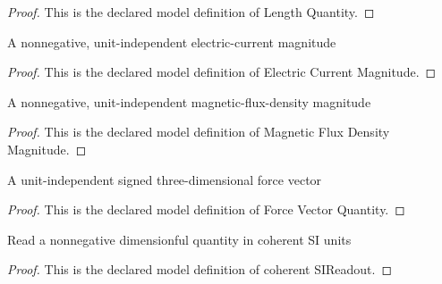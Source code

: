 \begin{proof}
  This is the declared model definition of Length Quantity.
\end{proof}
\begin{definition}
  \label{def:physics:phyx-mini-0952:phyxminiproblems-problemphyxmini0952-electriccurrentmagnitude}
  A nonnegative, unit-independent electric-current magnitude
\end{definition}
\begin{proof}
  This is the declared model definition of Electric Current Magnitude.
\end{proof}
\begin{definition}
  \label{def:physics:phyx-mini-0952:phyxminiproblems-problemphyxmini0952-magneticfluxdensitymagnitude}
  A nonnegative, unit-independent magnetic-flux-density magnitude
\end{definition}
\begin{proof}
  This is the declared model definition of Magnetic Flux Density Magnitude.
\end{proof}
\begin{definition}
  \label{def:physics:phyx-mini-0952:phyxminiproblems-problemphyxmini0952-forcevectorquantity}
  A unit-independent signed three-dimensional force vector
\end{definition}
\begin{proof}
  This is the declared model definition of Force Vector Quantity.
\end{proof}
\begin{definition}
  \label{def:physics:phyx-mini-0952:phyxminiproblems-problemphyxmini0952-coherentsireadout}
  Read a nonnegative dimensionful quantity in coherent SI units
\end{definition}
\begin{proof}
  This is the declared model definition of coherent SIReadout.
\end{proof}
